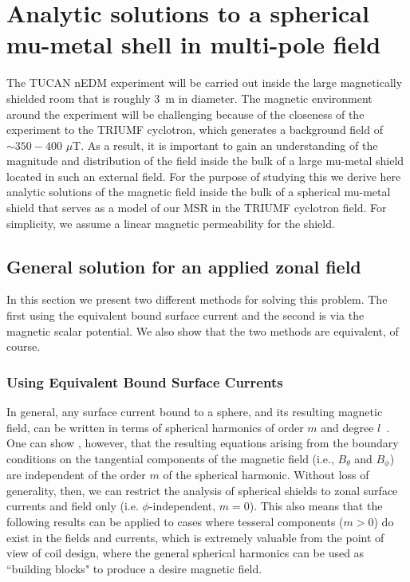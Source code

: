 
\chapter{Analytic solutions to a spherical mu-metal shell in multi-pole field}

The TUCAN nEDM experiment will be carried out inside the large magnetically shielded room that is roughly 3~m in diameter.  The magnetic environment around the experiment will be challenging because of the closeness of the experiment to the TRIUMF cyclotron, which generates a background field of $\sim 350 - 400$ $\mu$T.
As a result, it is important to gain an understanding of the magnitude and distribution of the field inside  the bulk of a large mu-metal shield located in such an external field. For the purpose of studying this we derive here analytic solutions of the magnetic field inside the bulk of a spherical mu-metal shield that serves as a model of our MSR in the TRIUMF cyclotron field.  For simplicity, we assume a linear magnetic permeability for the shield.


\section{General solution for an applied zonal field}
In this section we present two different methods for solving this problem.  The first using the equivalent bound surface current and the second is via the magnetic scalar potential.  We also show that the two methods are equivalent, of course.

\subsection{Using Equivalent Bound Surface Currents}

In general, any surface current bound to a sphere, and its resulting magnetic field, can be written in terms of spherical harmonics of order $m$ and degree $l$~\cite{CB1, smythe}. One can show , however, that the resulting equations arising from the boundary conditions on the tangential components of the magnetic field (i.e., $B_\theta$  and $B_\phi$) are independent of the order $m$ of the spherical harmonic. Without loss of generality, then, we can restrict the analysis of spherical shields to zonal surface currents and field only (i.e. $\phi$-independent, $m=0$). This also means that the following results can be applied to cases where tesseral components ($m > 0$) do exist in the fields and currents, which is extremely valuable from the point of view of coil design, where the general spherical harmonics can be used as ``building blocks" to produce a desire magnetic field.

